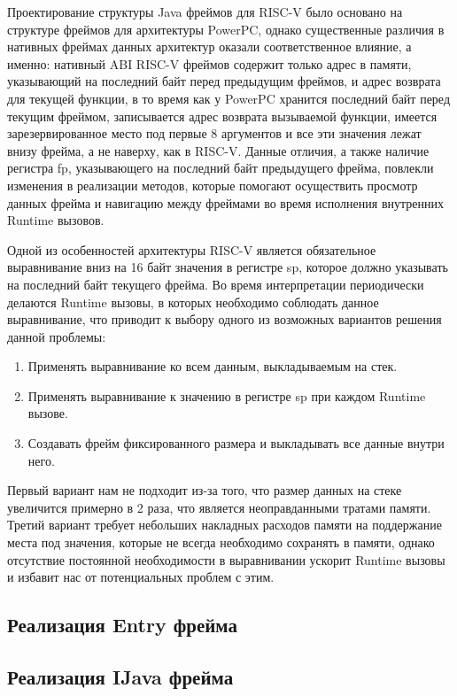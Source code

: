 \documentclass[14pt]{spbau-diploma}
\begin{document}
Проектирование структуры Java фреймов для RISC-V было основано на структуре фреймов для архитектуры PowerPC, однако существенные различия в нативных фреймах данных архитектур оказали соответственное влияние, а именно: нативный ABI RISC-V фреймов содержит только адрес в памяти, указывающий на последний байт перед предыдущим фреймов, и адрес возврата для текущей функции, в то время как у PowerPC хранится последний байт перед текущим фреймом, записывается адрес возврата вызываемой функции, имеется зарезервированное место под первые 8 аргументов и все эти значения лежат внизу фрейма, а не наверху, как в RISC-V.
Данные отличия, а также наличие регистра fp, указывающего на последний байт предыдущего фрейма, повлекли изменения в реализации методов, которые помогают осуществить просмотр данных фрейма и навигацию между фреймами во время исполнения внутренних Runtime вызовов.

Одной из особенностей архитектуры RISC-V является обязательное выравнивание вниз на 16 байт значения в регистре sp, которое должно указывать на последний байт текущего фрейма. Во время интерпретации периодически делаются Runtime вызовы, в которых необходимо соблюдать данное выравнивание, что приводит к выбору одного из возможных вариантов решения данной проблемы: 
\begin{enumerate}
    \item Применять выравнивание ко всем данным, выкладываемым на стек.
    \item Применять выравнивание к значению в регистре sp при каждом Runtime вызове.
    \item Создавать фрейм фиксированного размера и выкладывать все данные внутри него.
\end{enumerate}

Первый вариант нам не подходит из-за того, что размер данных на стеке увеличится примерно в 2 раза, что является неоправданными тратами памяти. Третий вариант требует небольших накладных расходов памяти на поддержание места под значения, которые не всегда необходимо сохранять в памяти, однако отсутствие постоянной необходимости в выравнивании ускорит Runtime вызовы и избавит нас от потенциальных проблем с этим.

\subsection{Реализация Entry фрейма}
\subsection{Реализация IJava фрейма}
\end{document}
